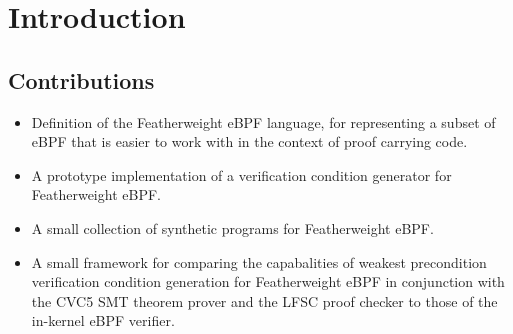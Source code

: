 \section{Introduction}
\label{sec:introduction}

\subsection{Contributions}
\label{subsec:contributions}

\begin{itemize}
\item Definition of the Featherweight eBPF language, for representing a subset of eBPF that is easier to work with in the context of proof carrying code.
\item A prototype implementation of a verification condition generator for Featherweight eBPF.
\item A small collection of synthetic programs for Featherweight eBPF.
\item A small framework for comparing the capabalities of weakest precondition verification condition generation for Featherweight eBPF in conjunction with the CVC5 SMT theorem prover and the LFSC proof checker to those of the in-kernel eBPF verifier.
\end{itemize}
